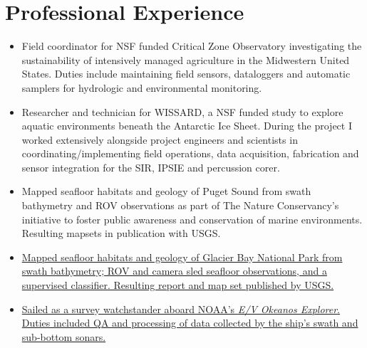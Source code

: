 \section{Professional Experience}

\begin{itemize}
\item Field coordinator for NSF funded Critical Zone Observatory investigating the sustainability of intensively managed agriculture in the Midwestern United States. 
  Duties include maintaining field sensors, dataloggers and automatic samplers for hydrologic and environmental monitoring.
\end{itemize}

\begin{itemize}
\item Researcher and technician for WISSARD, a NSF funded study to explore aquatic environments beneath the Antarctic Ice
  Sheet. During the project I worked extensively alongside project engineers and scientists in coordinating/implementing field operations, data acquisition, fabrication and sensor integration for the SIR, IPSIE and percussion corer. 
\item Mapped seafloor habitats and geology of Puget Sound from swath bathymetry and ROV observations as part of The Nature
  Conservancy's initiative to foster public awareness and conservation of marine
  environments. Resulting mapsets in publication with USGS.

\item \href{http://pubs.usgs.gov/sim/3253/}{Mapped seafloor habitats and geology
  of Glacier Bay National Park from swath bathymetry; ROV and camera sled seafloor observations, and a supervised classifier. Resulting report and map set published by USGS.}
  
\end{itemize}

\begin{itemize}
\item \href{http://www.niutoday.info/2014/04/17/niu-student-lands-coveted-internship-aboard-exploration-ship/}
  {Sailed as a survey watchstander aboard NOAA's \textit{E/V Okeanos Explorer}.
  Duties included QA and processing of data collected by the ship's swath and sub-bottom sonars.}
\end{itemize}

